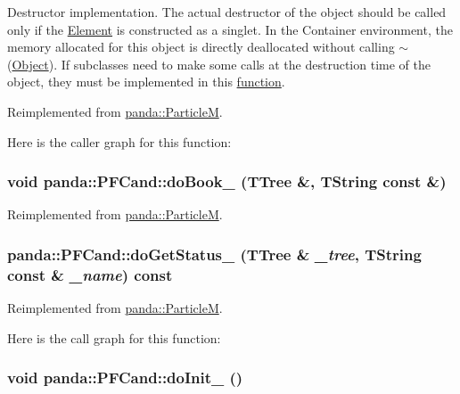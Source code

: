 Destructor implementation. The actual destructor of the object should be called only if the \hyperlink{classpanda_1_1Element}{Element} is constructed as a singlet. In the Container environment, the memory allocated for this object is directly deallocated without calling $\sim$(\hyperlink{classpanda_1_1Object}{Object}). If subclasses need to make some calls at the destruction time of the object, they must be implemented in this \hyperlink{namespacepanda_1_1function}{function}. 

Reimplemented from \hyperlink{classpanda_1_1ParticleM_abef15d28e6e33ee92c0b318bd41af2ca}{panda::ParticleM}.

Here is the caller graph for this function:\hypertarget{classpanda_1_1PFCand_a0e032b321a5b1003d7639b72a211c7be}{
\subsubsection[{doBook\_\-}]{\setlength{\rightskip}{0pt plus 5cm}void panda::PFCand::doBook\_\- (TTree \&, \/  TString const \&)}}
\label{classpanda_1_1PFCand_a0e032b321a5b1003d7639b72a211c7be}


Reimplemented from \hyperlink{classpanda_1_1ParticleM_a55d6e7e91edbc88e980a0031c299ef18}{panda::ParticleM}.\hypertarget{classpanda_1_1PFCand_a3567f5259663a227698b6e27cc340cb4}{
\subsubsection[{doGetStatus\_\-}]{ panda::PFCand::doGetStatus\_\- (TTree \& {\em \_\-tree}, \/  TString const \& {\em \_\-name}) const}}
\label{classpanda_1_1PFCand_a3567f5259663a227698b6e27cc340cb4}


Reimplemented from \hyperlink{classpanda_1_1ParticleM_a003a63672058369e9bbea413e055b1c1}{panda::ParticleM}.

Here is the call graph for this function:\hypertarget{classpanda_1_1PFCand_afef3eb199afc086c2952e479fa1f191b}{
\subsubsection[{doInit\_\-}]{\setlength{\rightskip}{0pt plus 5cm}void panda::PFCand::doInit\_\- ()}}
\label{classpanda_1_1PFCand_afef3eb199afc086c2952e479fa1f191b}


